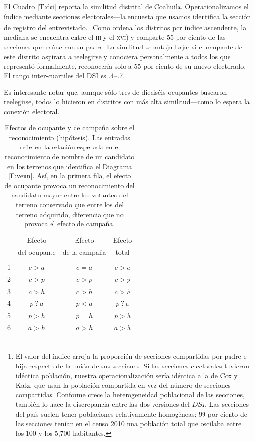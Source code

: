 \documentclass[letter,12pt]{article}
\begin{document}
El Cuadro \ref{T:dsi} reporta la similitud distrital de Coahuila. Operacionalizamos el índice mediante secciones electorales---la encuesta que usamos identifica la sección de registro del entrevistado.\footnote{El valor del índice arroja la proporción de secciones compartidas por padre e hijo respecto de la unión de sus secciones. Si las secciones electorales tuvieran idéntica población, nuestra operacionalización sería idéntica a la de Cox y Katz, que usan la población compartida en vez del número de secciones compartidas. Conforme crece la heterogeneidad poblacional de las secciones, también lo hace la discrepancia entre las dos versiones del $DSI$. Las secciones del país suelen tener poblaciones relativamente homogéneas: 99 por ciento de las secciones tenían en el censo 2010 una población total que oscilaba entre los 100 y los 5,700 habitantes.} Como ordena los distritos por índice ascendente, la mediana se encuentra entre el \textsc{iii} y el \textsc{xvi}) y comparte 55 por ciento de las secciones que reúne con su padre. La similitud se antoja baja: si el ocupante de este distrito aspirara a reelegirse y conociera personalmente a todos los que representó formalmente, reconocería solo a 55 por ciento de su nuevo electorado. El rango inter-cuartiles del DSI es .4--.7. 

Es interesante notar que, aunque sólo tres de dieciséis ocupantes buscaron reelegirse, todos lo hicieron en distritos con más alta similitud---como lo espera la conexión electoral. 

\begin{table}
  \centering
  \begin{tabular}{cccc}
    & Efecto &       Efecto &        Efecto \\ [-.5ex]
    & del ocupante & de la campaña & total\\ \hline
    \\ [-1.2ex]
    1 & $c>a$   & $c=a$  & $c>a$   \\
    2 & $c>p$   & $c>p$  & $c>p$   \\
    3 & $c>h$   & $c>h$  & $c>h$   \\
    4 & $p~?~a$ & $p<a$  & $p~?~a$ \\
    5 & $p>h$   & $p=h$  & $p>h$   \\
    6 & $a>h$   & $a>h$  & $a>h$   \\ \\ [-1.2ex] \hline 
  \end{tabular}
  \caption{Efectos de ocupante y de campaña sobre el reconocimiento (hipótesis). Las entradas refieren la relación esperada en el reconocimiento de nombre de un candidato en los terrenos que identifica el Diagrama \ref{F:venn}. Así, en la primera fila, el efecto de ocupante provoca un reconocimiento del candidato mayor entre los votantes del terreno conservado que entre los del terreno adquirido, diferencia que no provoca el efecto de campaña.}\label{T:hyps}
\end{table}
\end{document}
